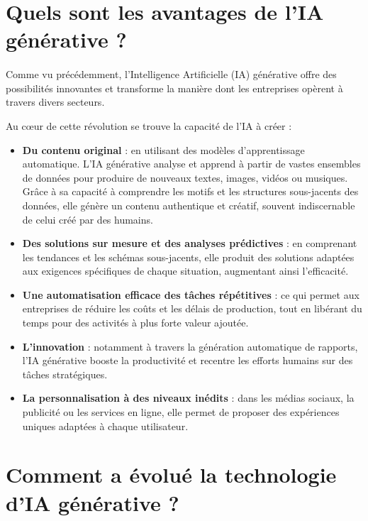 \section{Quels sont les avantages de l’IA générative ?}
\paragraph{}
Comme vu précédemment, l'Intelligence Artificielle (IA) générative offre des
possibilités innovantes et transforme la manière dont les entreprises opèrent à
travers divers secteurs.

Au cœur de cette révolution se trouve la capacité de l'IA à créer :

\begin{itemize}[label=--]
	\item \textbf{Du contenu original} : en utilisant des modèles d'apprentissage
		automatique. L’IA générative analyse et apprend à partir de vastes ensembles
		de données pour produire de nouveaux textes, images, vidéos ou musiques.
		Grâce à sa capacité à comprendre les motifs et les structures sous-jacents
		des données, elle génère un contenu authentique et créatif, souvent
		indiscernable de celui créé par des humains.

	\item \textbf{Des solutions sur mesure et des analyses prédictives} : en
		comprenant les tendances et les schémas sous-jacents, elle produit des solutions
		adaptées aux exigences spécifiques de chaque situation, augmentant ainsi l'efficacité.

	\item \textbf{Une automatisation efficace des tâches répétitives} : ce qui
		permet aux entreprises de réduire les coûts et les délais de production, tout
		en libérant du temps pour des activités à plus forte valeur ajoutée.

	\item \textbf{L’innovation} : notamment à travers la génération automatique de
		rapports, l'IA générative booste la productivité et recentre les efforts humains
		sur des tâches stratégiques.

	\item \textbf{La personnalisation à des niveaux inédits} : dans les médias
		sociaux, la publicité ou les services en ligne, elle permet de proposer des
		expériences uniques adaptées à chaque utilisateur.
\end{itemize}
\section{Comment a évolué la technologie d'IA générative ?}
